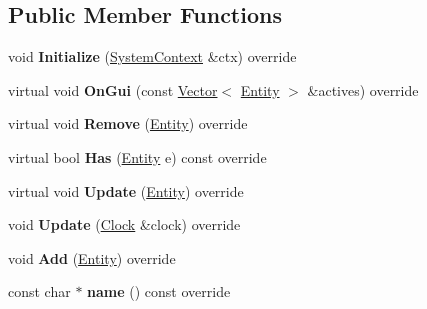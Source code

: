\subsection*{Public Member Functions}
\begin{DoxyCompactItemize}
\item 
\mbox{\label{classnabla_1_1_collision_system_acdab7a5282cf8a05a85c7ad3207482fa}} 
void {\bfseries Initialize} (\mbox{\hyperlink{structnabla_1_1_system_context}{System\+Context}} \&ctx) override
\item 
\mbox{\label{classnabla_1_1_collision_system_a84ee1b6ac3cf3b61476e33d60467eb81}} 
virtual void {\bfseries On\+Gui} (const \mbox{\hyperlink{classnabla_1_1_s_t_l_vector_ex}{Vector}}$<$ \mbox{\hyperlink{structnabla_1_1_entity}{Entity}} $>$ \&actives) override
\item 
\mbox{\label{classnabla_1_1_collision_system_a6d9cdc3721fe919d12b67698cb69f48b}} 
virtual void {\bfseries Remove} (\mbox{\hyperlink{structnabla_1_1_entity}{Entity}}) override
\item 
\mbox{\label{classnabla_1_1_collision_system_adb01e97786eca5d70999efbe07742135}} 
virtual bool {\bfseries Has} (\mbox{\hyperlink{structnabla_1_1_entity}{Entity}} e) const override
\item 
\mbox{\label{classnabla_1_1_collision_system_af29fe56665f237898823d57da9a4e44e}} 
virtual void {\bfseries Update} (\mbox{\hyperlink{structnabla_1_1_entity}{Entity}}) override
\item 
\mbox{\label{classnabla_1_1_collision_system_afd760e9b04db88e2f90611f5a8f2cac5}} 
void {\bfseries Update} (\mbox{\hyperlink{classnabla_1_1_clock}{Clock}} \&clock) override
\item 
\mbox{\label{classnabla_1_1_collision_system_a3b62f2b0cd49716f3568e70f245ab99e}} 
void {\bfseries Add} (\mbox{\hyperlink{structnabla_1_1_entity}{Entity}}) override
\item 
\mbox{\label{classnabla_1_1_collision_system_af6d33ec1362ef1b85b87a259382d8dd3}} 
const char $\ast$ {\bfseries name} () const override
\end{DoxyCompactItemize}


